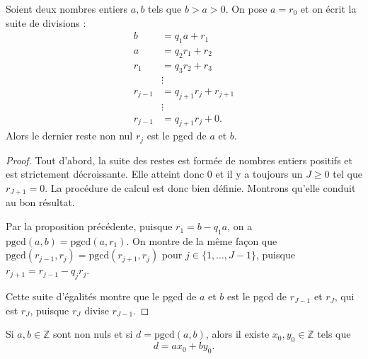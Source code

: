 \begin{proposition}
Soient deux nombres entiers \( a, b \) tels que \( b > a > 0 \).  
On pose \( a = r_0 \) et on écrit la suite de divisions :
\[
\begin{aligned}
    b &= q_1 a + r_1 \\
    a &= q_2 r_1 + r_2 \\
    r_1 &= q_3 r_2 + r_3 \\
    &\vdots \\
    r_{j-1} &= q_{j+1} r_j + r_{j+1} \\
    &\vdots \\
    r_{j-1} &= q_{j+1} r_j + 0.
\end{aligned}
\]
Alors le dernier reste non nul \( r_j \) est le pgcd de \( a \) et \( b \).
\end{proposition}

\begin{proof}
Tout d'abord, la suite des restes est formée de nombres entiers positifs et est strictement décroissante. Elle atteint donc 0 et il y a toujours un \( J \geq 0 \) tel que \( r_{J+1} = 0 \).  
La procédure de calcul est donc bien définie. Montrons qu'elle conduit au bon résultat.  

Par la proposition précédente, puisque \( r_1 = b - q_1 a \), on a \( \text{pgcd}(a, b) = \text{pgcd}(a, r_1) \).  
On montre de la même façon que \( \text{pgcd}(r_{j-1}, r_j) = \text{pgcd}(r_{j+1}, r_j) \) pour \( j \in \{1, \dots, J-1\} \),  
puisque \( r_{j+1} = r_{j-1} - q_j r_j \).  

Cette suite d’égalités montre que le pgcd de \( a \) et \( b \) est le pgcd de \( r_{J-1} \) et \( r_J \),  
qui est \( r_J \), puisque \( r_J \) divise \( r_{J-1} \).
\end{proof}


\begin{theoreme}[Bézout]
Si \( a, b \in \mathbb{Z} \) sont non nuls et si \( d = \text{pgcd}(a, b) \), alors il existe \( x_0, y_0 \in \mathbb{Z} \) tels que  
\[
d = ax_0 + by_0.
\]
\end{theoreme}

